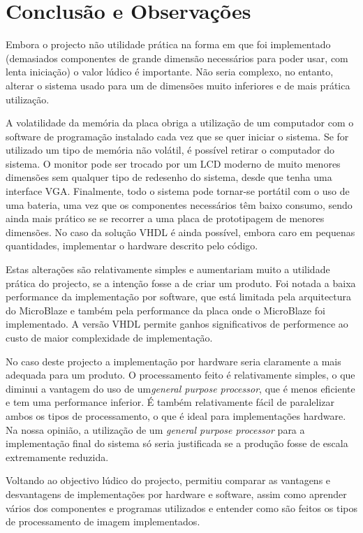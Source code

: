 \documentclass[a4paper,12pt]{article}
\begin{document}
\clearpage
\section{Conclusão e Observações}
Embora o projecto não utilidade prática na forma em que foi implementado (demasiados componentes de grande dimensão necessários para poder usar, com lenta iniciação) o valor lúdico é importante. Não seria complexo, no entanto, alterar o sistema usado para um de dimensões muito inferiores e de mais prática utilização. 

A volatilidade da memória da placa obriga a utilização de um computador com o software de programação instalado cada vez que se quer iniciar o sistema. Se for utilizado um tipo de memória não volátil, é possível retirar o computador do sistema. O monitor pode ser trocado por um LCD moderno de muito menores dimensões sem qualquer tipo de redesenho do sistema, desde que tenha uma interface VGA. Finalmente, todo o sistema pode tornar-se portátil com o uso de uma bateria, uma vez que os componentes necessários têm baixo consumo, sendo ainda mais prático se se recorrer a uma placa de prototipagem de menores dimensões. No caso da solução VHDL é ainda possível, embora caro em pequenas quantidades, implementar o hardware descrito pelo código. 

Estas alterações são relativamente simples e aumentariam muito a utilidade prática do projecto, se a intenção fosse a de criar um produto. 
Foi notada a baixa performance da implementação por software, que está limitada pela arquitectura do MicroBlaze e também pela performance da placa onde o MicroBlaze foi implementado. A versão VHDL permite ganhos significativos de performence ao custo de maior complexidade de implementação.   

No caso deste projecto a implementação por hardware seria claramente a mais adequada para um produto. O processamento feito é relativamente simples, o que diminui a vantagem do uso de um\textit{general purpose processor}, que é menos eficiente e tem uma performance inferior. É também relativamente fácil de paralelizar ambos os tipos de processamento, o que é ideal para implementações hardware. Na nossa opinião, a utilização de um \textit{general purpose processor} para a implementação final do sistema só seria justificada se a produção fosse de escala extremamente reduzida.

Voltando ao objectivo lúdico do projecto, permitiu comparar as vantagens e desvantagens de implementações por hardware e software, assim como aprender vários dos componentes e programas utilizados e entender como são feitos os tipos de processamento de imagem implementados. 



\nocite{labsECom}
\end{document}
